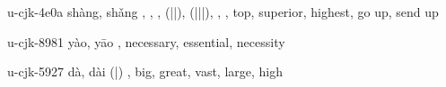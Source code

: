\begin{multicols}{2}
\lettrine[lines=3]{\cjkgGlue{}}{}\begin{minipage}{0.8\linewidth} u-cjk-4e0a  shàng, shǎng  \cjkgGlue{}, \cjkgGlue{}, \cjkgGlue{}, \cjkgGlue{}(\cjkgGlue{}|\cjkgGlue{}|\cjkgGlue{}), \cjkgGlue{}(\cjkgGlue{}|\cjkgGlue{}|\cjkgGlue{}|\cjkgGlue{}), \cjkgGlue{} \cjkgGlue{}, \cjkgGlue{}, \cjkgGlue{} top, superior, highest, go up, send up \end{minipage}

\lettrine[lines=3]{\cjkgGlue{}}{}\begin{minipage}{0.8\linewidth} u-cjk-8981  yào, yāo  \cjkgGlue{}, \cjkgGlue{} \cjkgGlue{} necessary, essential, necessity \end{minipage}

\lettrine[lines=3]{\cjkgGlue{}}{}\begin{minipage}{0.8\linewidth} u-cjk-5927  dà, dài  \cjkgGlue{}(\cjkgGlue{}|\cjkgGlue{})  \cjkgGlue{}, \cjkgGlue{} big, great, vast, large, high \end{minipage}


\end{multicols}
